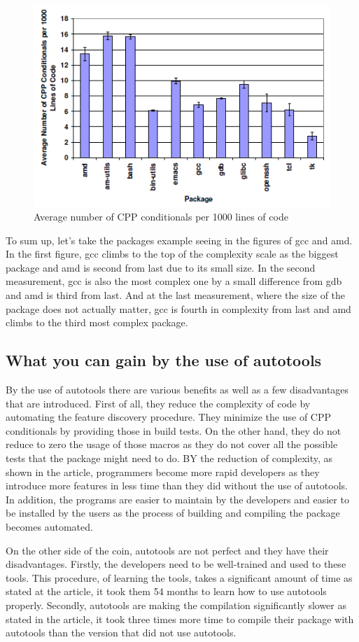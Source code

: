 \documentclass[11pt]{article}
\begin{document}
\begin{figure}[!htb]
\centering
  \includegraphics[width=.7\linewidth]{images/measure3}
  \caption{Average number of CPP conditionals per 1000 lines
of code \cite{zadok2002}}
  \label{fig:measure3}
\end{figure}
\FloatBarrier
To sum up, let's take the packages example seeing in the figures of gcc and amd. In the first figure, gcc climbs to the top of the complexity scale as the biggest package and amd is second from last due to its small size. In the second measurement, gcc is also the most complex one by a small difference from gdb and amd is third from last. And at the last measurement, where the size of the package does not actually matter, gcc is fourth in complexity from last and amd climbs to the third most complex package.

\subsection{What you can gain by the use of autotools}
By the use of autotools there are various benefits as well as a few disadvantages that are introduced. First of all, they reduce the complexity of code by automating the feature discovery procedure. They minimize the use of CPP conditionals by providing those in build tests. On the other hand, they do not reduce to zero the usage of those macros as they do not cover all the possible tests that the package might need to do. BY the reduction of complexity, as shown in the article, programmers become more rapid developers as they introduce more features in less time than they did without the use of autotools. In addition, the programs are easier to maintain by the developers and easier to be installed by the users as the process of building and compiling the package becomes automated.

On the other side of the coin, autotools are not perfect and they have their disadvantages. Firstly, the developers need  to be well-trained and used to these tools. This procedure, of learning the tools, takes a significant amount of time as stated at the article, it took them 54 months to learn how to use autotools properly. Secondly, autotools are making the compilation significantly slower as stated in the article, it took three times more time to compile their package with autotools than the version that did not use autotools.
\end{document}
